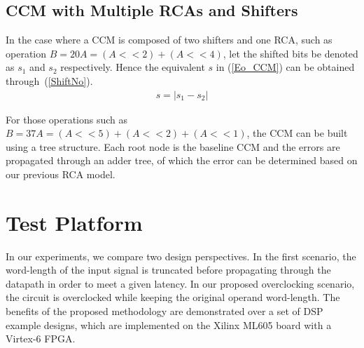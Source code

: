 \documentclass[journal]{IEEEtran}
\begin{document}
\subsection{CCM with Multiple RCAs and Shifters}\label{CCM_Multi}
In the case where a CCM is composed of two shifters and one RCA, such as operation $\!B\!=\!20A\!=\!(\!A<<2)+(\!A<<4)$, let the shifted bits be denoted as $s_1$ and $s_2$ respectively. Hence the equivalent $s$ in (\ref{Eo_CCM}) can be obtained through~(\ref{ShiftNo}).
%
\begin{eqnarray}\label{ShiftNo}
  s=\left|s_1-s_2\right|
\end{eqnarray}

For those operations such as $B=37A=(A<<5)+(A<<2)+(A<<1)$, the CCM can be built using a tree structure. Each root node is the baseline CCM and the errors are propagated through an adder tree, of which the error can be determined based on our previous RCA model.

\section{Test Platform}\label{Experiment}
In our experiments, we compare two design perspectives. In the first scenario, the word-length of the input signal is truncated before propagating through the datapath in order to meet a given latency. In our proposed overclocking scenario, the circuit is overclocked while keeping the original operand word-length. The benefits of the proposed methodology are demonstrated over a set of DSP example designs, which are implemented on the Xilinx ML605 board with a Virtex-6 FPGA. 
\end{document}
